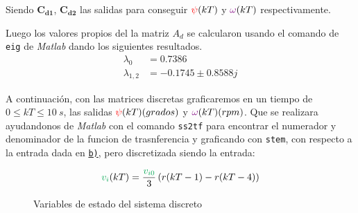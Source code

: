 Siendo $\pmb{C_{d1}} $, $\pmb{C_{d2}} $ las salidas para conseguir $\mathbin{\color{red}\psi}(kT)$
y $\mathbin{\color{violet}\omega}(kT)$ respectivamente.

Luego los valores propios del la matriz $A_d$ se calcularon usando el comando
de \verb|eig| de \textit{Matlab} dando los siguientes resultados.
\begin{align}
  \lambda_{0} &=  0.7386 \\
  \lambda_{1,2} &=  -0.1745 \pm 0.8588j
\end{align}

A continuación, con las matrices discretas  graficaremos en un tiempo de
$0 \leq kT \leq 10\ \unit{s}$, las salidas $ \mathbin{\color{red}\psi}(kT)(grados) $ y
$ \mathbin{\color{violet}\omega}(kT)(rpm) $. Que se realizara ayudandonos de \textit{Matlab} con
el comando \verb|ss2tf|  para encontrar el numerador y denominador de la funcion
de trasnferencia  y graficando con  \verb|stem|,  con respecto a la entrada
dada en \hyperref[pregunta-b]{\texttt{b)}}, pero discretizada siendo la entrada:

\begin{equation}
  \verd{v_{i}}(kT) = \frac{\verd{v_{i0}}}{3}\left(r(kT-1) - r(kT-4)\right)
\end{equation}

\begin{figure}[h]
  \centering
  
  \caption{Variables de estado del sistema discreto}\label{fig:estado-discreto}
\end{figure}
